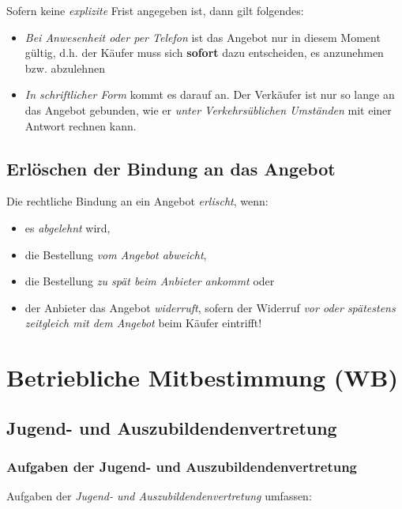 \documentclass[a4paper, 12pt]{report}
\begin{document}
Sofern keine \emph{explizite} Frist angegeben ist, dann gilt folgendes: 

\begin{itemize}
    \item \emph{Bei Anwesenheit oder per Telefon} ist das Angebot nur in diesem
        Moment gültig, d.h. der Käufer muss sich \textbf{sofort} dazu 
        entscheiden, es anzunehmen bzw. abzulehnen
    \item \emph{In schriftlicher Form} kommt es darauf an. Der Verkäufer ist nur 
        so lange an das Angebot gebunden, wie er \emph{unter Verkehrsüblichen 
        Umständen} mit einer Antwort rechnen kann.
\end{itemize}

\subsection{Erlöschen der Bindung an das Angebot}

Die rechtliche Bindung an ein Angebot \emph{erlischt}, wenn:

\begin{itemize}
    \item es \emph{abgelehnt} wird, 
    \item die Bestellung \emph{vom Angebot abweicht},
    \item die Bestellung \emph{zu spät beim Anbieter ankommt} oder 
    \item der Anbieter das Angebot \emph{widerruft}, sofern der Widerruf \emph{
        vor oder spätestens zeitgleich mit dem Angebot} beim Käufer 
        eintrifft!
\end{itemize}


\section{Betriebliche Mitbestimmung (WB)}

\subsection{Jugend- und Auszubildendenvertretung}

\subsubsection{Aufgaben der Jugend- und Auszubildendenvertretung}

Aufgaben der \emph{Jugend- und Auszubildendenvertretung} umfassen: 
\end{document}

